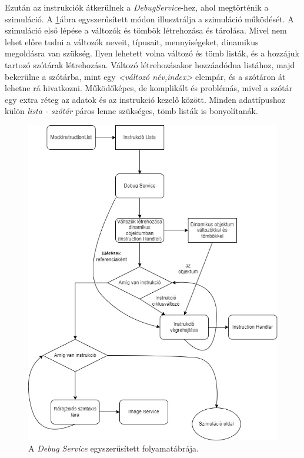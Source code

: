Ezután az instrukciók átkerülnek a \textit{DebugService}-hez, ahol megtörténik a szimuláció.
A \ref{fig:debugflow}\enskip ábra egyszerűsített módon illusztrálja a szimuláció működését. A szimuláció első lépése a változók és tömbök létrehozása és tárolása. Mivel nem lehet előre tudni a változók neveit, típusait, mennyiségeket, dinamikus megoldásra van szükség. Ilyen lehetett volna változó és tömb listák, és a hozzájuk tartozó szótárak létrehozása. Változó létrehozásakor hozzáadódna listához, majd bekerülne a szótárba, mint egy \textit{<változó név,index>} elempár, és a szótáron át lehetne rá hivatkozni. Működőképes, de komplikált és problémás, mivel a szótár egy extra réteg az adatok és az instrukció kezelő között. Minden adattípushoz külön \textit{lista - szótár} páros lenne szükséges, tömb listák is bonyolítanák.

\begin{figure}[h]
\centering
\includegraphics[scale=0.65]{images/SimpleDebug.jpg}
\caption{A \textit{Debug Service} egyszerűsített folyamatábrája.}
\label{fig:debugflow}
\end{figure}



